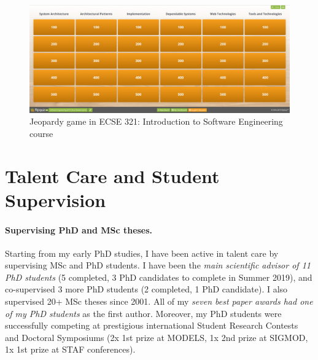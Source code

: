 \documentclass[a4paper,11pt]{report}
\begin{document}
\begin{figure}[htb]
\centering
\includegraphics[width=.8\textwidth]{figures/FlipQuiz}
\caption{Jeopardy game in ECSE 321: Introduction to Software Engineering course}
\label{fig:jeopardy-ecse321}
\end{figure}











\section{Talent Care and Student Supervision}
\paragraph{Supervising PhD and MSc theses.}
Starting from my early PhD studies, I have been active in talent care by supervising MSc and PhD students. I have been the \emph{main scientific advisor of 11 PhD students} (5 completed, 3 PhD candidates to complete in Summer 2019), and co-supervised 3 more PhD students (2 completed, 1 PhD candidate). I also supervised 20+ MSc theses since 2001. All of my \emph{seven best paper awards had one of my PhD students} as the first author. Moreover, my PhD students were successfully competing at prestigious international Student Research Contests and Doctoral Symposiums (2x 1st prize at MODELS, 1x 2nd prize at SIGMOD, 1x 1st prize at STAF conferences).
\end{document}
